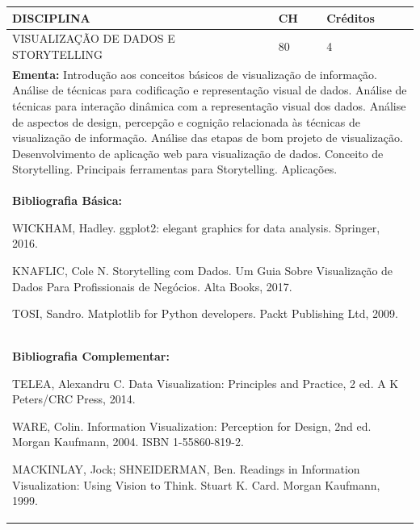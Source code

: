 \documentclass[a4paper, 12pt, openright, oneside, german, french, english, brazil]{abntex2}
\begin{document}
\begin{table}[!h]
  \footnotesize
  \centering
  \begin{tabular}{|p{100mm}|p{10mm}|p{20mm}|}
    \hline
    \textbf{DISCIPLINA} & \textbf{CH} & \textbf{Créditos} \\
    \hline
    VISUALIZAÇÃO DE DADOS E STORYTELLING & 80 & 4 \\
    \hline
    \multicolumn{3}{|p{130mm}|}{\textbf{Ementa:}  Introdução aos conceitos básicos de visualização de informação. Análise de técnicas para codificação e representação visual de dados. Análise de técnicas para interação dinâmica com a representação visual dos dados. Análise de aspectos de design, percepção e cognição relacionada às técnicas de visualização de informação. Análise das etapas de bom projeto de visualização. Desenvolvimento de aplicação web para visualização de dados. Conceito de Storytelling. Principais ferramentas para Storytelling. Aplicações.} \\
    \hline
    \multicolumn{3}{|p{130mm}|}{\textbf{Bibliografia Básica:}

    WICKHAM, Hadley. ggplot2: elegant graphics for data analysis. Springer, 2016.

KNAFLIC, Cole N. Storytelling com Dados. Um Guia Sobre Visualização de Dados Para Profissionais de Negócios. Alta Books, 2017.

TOSI, Sandro. Matplotlib for Python developers. Packt Publishing Ltd, 2009.
} \\
    \hline
    \multicolumn{3}{|p{130mm}|}{\textbf{Bibliografia Complementar:}

    TELEA, Alexandru C. Data Visualization: Principles and Practice, 2 ed. A K Peters/CRC Press, 2014.

WARE, Colin. Information Visualization: Perception for Design, 2nd ed. Morgan Kaufmann, 2004. ISBN 1-55860-819-2.

MACKINLAY, Jock; SHNEIDERMAN, Ben. Readings in Information Visualization: Using Vision to Think. Stuart K. Card. Morgan Kaufmann, 1999. 
} \\
    \hline
  \end{tabular}
\end{table}
\end{document}
